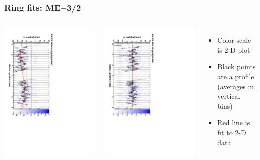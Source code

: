 \documentclass[compress]{beamer}
\begin{document}
\begin{frame}
\frametitle{Ring fits: ME$-$3/2}
\vfill
\begin{columns}
\includegraphics[height=\linewidth, angle=90]{ringfits_before/mem32.pdf}

\includegraphics[height=\linewidth, angle=90]{ringfits_after/mem32.pdf}
\begin{itemize}
\item Color scale is 2-D plot
\item Black points are a profile (averages in vertical bins)
\item Red line is fit to 2-D data
\end{itemize}
\end{columns}
\end{frame}
\end{document}
